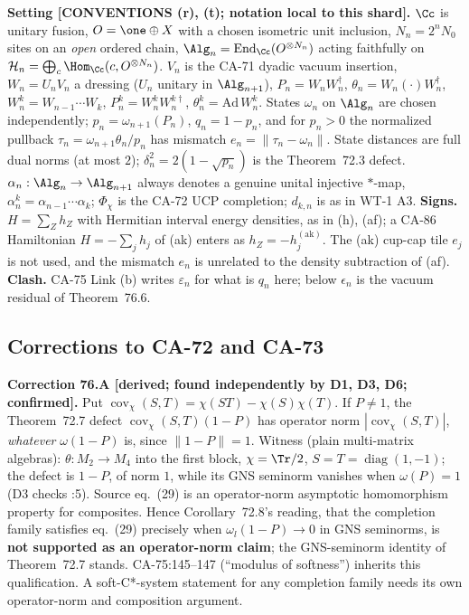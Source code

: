 \textbf{Setting [CONVENTIONS (r), (t); notation local to this shard].}  \(\Cc\) is unitary fusion, \(O=\one\oplus X\) with a
chosen isometric unit inclusion, \(N_n=2^nN_0\) sites on an \emph{open} ordered chain,
\(\Alg_n=\operatorname{End}_\Cc(O^{\otimes N_n})\) acting faithfully on \(\mathcal H_n=\bigoplus_c\Hom_\Cc(c,O^{\otimes N_n})\).
\(V_n\) is the CA-71 dyadic vacuum insertion, \(W_n=U_nV_n\) a dressing (\(U_n\) unitary in \(\Alg_{n+1}\)),
\(P_n=W_nW_n^\dagger\), \(\theta_n=W_n(\cdot)W_n^\dagger\), \(W^k_n=W_{n-1}\cdots W_k\), \(P^k_n=W^k_nW^{k\dagger}_n\),
\(\theta^k_n=\mathrm{Ad}\,W^k_n\).  States \(\omega_n\) on \(\Alg_n\) are chosen independently; \(p_n=\omega_{n+1}(P_n)\),
\(q_n=1-p_n\), and for \(p_n>0\) the normalized pullback \(\tau_n=\omega_{n+1}\theta_n/p_n\) has mismatch
\(e_n=\|\tau_n-\omega_n\|\).  State distances are full dual norms (at most \(2\)); \(\delta_n^2=2(1-\sqrt{p_n})\) is the
Theorem~72.3 defect.  \(\alpha_n:\Alg_n\to\Alg_{n+1}\) always denotes a genuine unital injective \(*\)-map,
\(\alpha^k_n=\alpha_{n-1}\cdots\alpha_k\); \(\Phi_\chi\) is the CA-72 UCP completion; \(d_{k,n}\) is as in WT-1 A3.
\textbf{Signs.}  \(H=\sum_Zh_Z\) with Hermitian interval energy densities, as in (h), (af); a CA-86 Hamiltonian
\(H=-\sum_jh_j\) of (ak) enters as \(h_Z=-h^{(\mathrm{ak})}_j\).  The (ak) cup-cap tile \(e_j\) is not used, and the
mismatch \(e_n\) is unrelated to the density subtraction of (af).  \textbf{Clash.}  CA-75 Link (b) writes
\(\varepsilon_n\) for what is \(q_n\) here; below \(\epsilon_n\) is the vacuum residual of Theorem~76.6.

\subsection{Corrections to CA-72 and CA-73}

\textbf{Correction 76.A [derived; found independently by D1, D3, D6; confirmed].}  Put
\(\operatorname{cov}_\chi(S,T)=\chi(ST)-\chi(S)\chi(T)\).  If \(P\ne1\), the Theorem~72.7 defect
\(\operatorname{cov}_\chi(S,T)(1-P)\) has operator norm \(|\operatorname{cov}_\chi(S,T)|\), \emph{whatever}
\(\omega(1-P)\) is, since \(\|1-P\|=1\).  Witness (plain multi-matrix algebras): \(\theta:M_2\to M_4\) into the first
block, \(\chi=\Tr/2\), \(S=T=\operatorname{diag}(1,-1)\); the defect is \(1-P\), of norm \(1\), while its GNS seminorm
vanishes when \(\omega(P)=1\) (D3 checks :5).  Source eq.~(29) is an operator-norm asymptotic
homomorphism property for composites.  Hence Corollary~72.8's reading, that the completion family satisfies eq.~(29)
precisely when \(\omega_l(1-P)\to0\) in GNS seminorms, is \textbf{not supported as an operator-norm claim}; the
GNS-seminorm identity of Theorem~72.7 stands.  CA-75:145--147 (``modulus of softness'') inherits this qualification.
A soft-C*-system statement for any completion family needs its own operator-norm and composition argument.

